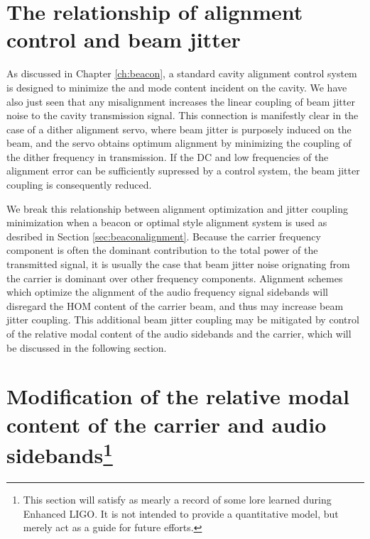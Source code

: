 \section{The relationship of alignment control and beam jitter}
As discussed in Chapter \ref{ch:beacon}, a standard cavity alignment control system is designed to minimize the  and  mode content incident on the cavity. %
We have also just seen that any misalignment increases the linear coupling of beam jitter noise to the cavity transmission signal. %
This connection is manifestly clear in the case of a dither alignment servo, where beam jitter is purposely induced on the beam, and the servo obtains optimum alignment by minimizing the coupling of the dither frequency in transmission. %
If the DC and low frequencies of the alignment error can be sufficiently supressed by a control system, the beam jitter coupling is consequently reduced.


We break this relationship between alignment optimization and jitter coupling minimization when a beacon or optimal style alignment system is used as desribed in Section \ref{sec:beaconalignment}. %
Because the carrier frequency component is often the dominant contribution to the total power of the transmitted signal, it is usually the case that beam jitter noise orignating from the carrier is dominant over other frequency components. %
Alignment schemes which optimize the alignment of the audio frequency signal sidebands will disregard the HOM content of the carrier beam, and thus may increase beam jitter coupling. %
This additional beam jitter coupling may be mitigated by control of the relative modal content of the audio sidebands and the carrier, which will be discussed in the following section.

\section[Modification of the relative modal content of the carrier and audio sidebands]{Modification of the relative modal content of the carrier and audio sidebands\footnote{This section will satisfy as mearly a record of some lore learned during Enhanced LIGO. It is not intended to provide a quantitative model, but merely act as a guide for future efforts.}}

